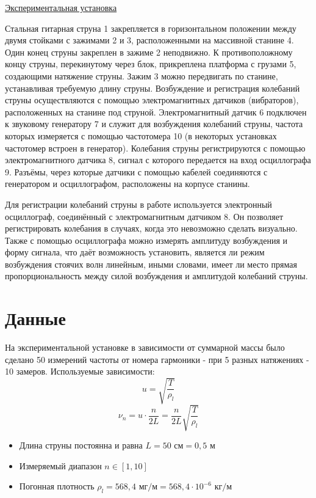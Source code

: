 \documentclass[a4paper]{article}
\begin{document}
\underline{Экспериментальная установка} \newline
\par
Стальная гитарная струна 1 закрепляется в горизонтальном положении между двумя стойками с зажимами 2 и 3, расположенными на массивной станине 4. Один конец струны закреплен в зажиме 2 неподвижно. К противоположному концу струны, перекинутому через блок, прикреплена платформа с грузами 5, создающими натяжение струны. Зажим 3 можно передвигать по станине, устанавливая требуемую длину струны. Возбуждение и регистрация колебаний струны осуществляются с помощью электромагнитных датчиков (вибраторов), расположенных на станине под струной. Электромагнитный датчик 6 подключен к звуковому генератору 7 и служит для возбуждения колебаний струны, частота которых измеряется с помощью частотомера 10 (в некоторых установках частотомер встроен в генератор). Колебания струны регистрируются с помощью электромагнитного датчика 8, сигнал с которого передается на вход осциллографа 9. Разъёмы, через которые датчики с помощью кабелей соединяются с генератором и осциллографом, расположены на корпусе станины.\par

Для регистрации колебаний струны в работе используется электронный осциллограф, соединённый с электромагнитным датчиком 8. Он позволяет регистрировать колебания в случаях, когда это невозможно сделать визуально. Также с помощью осциллографа можно измерять амплитуду возбуждения и форму сигнала, что даёт возможность установить, является ли режим возбуждения стоячих волн линейным, иными словами, имеет ли место прямая пропорциональность между силой возбуждения и амплитудой колебаний струны.
\newpage


\section{Данные}

На экспериментальной установке в зависимости от суммарной массы было сделано 50 измерений частоты от номера гармоники - при 5 разных натяжениях - 10 замеров.
Используемые зависимости:
\[u = \sqrt{\frac{T}{\rho_{l}}}\]
\[\nu_{n} = u \cdot \frac{n}{2L} = \frac{n}{2L}\sqrt{\frac{T}{\rho_{l}}}\]


\begin{itemize}
    \item Длина струны постоянна и равна $L = 50 \text{ см} = 0,5 \text{ м}$ 
    \item Измеряемый диапазон $n \in [1,10]$
    \item Погонная плотность $\rho_{l} = 568,4 \text{ мг/м} = 568,4 \cdot 10^{-6} \text{ кг/м}$
\end{itemize}
\end{document}
